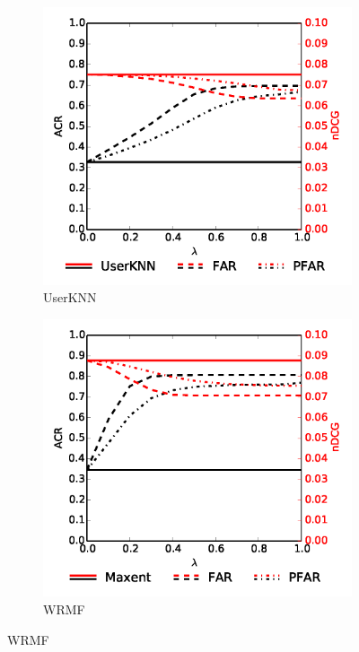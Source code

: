 \begin{figure}
\begin{subfigure}{0.49\columnwidth}
		\includegraphics[width=\textwidth]{imgs/far/userknn.png}
		\caption{UserKNN \cite{resnick1997recommender}} %
	\end{subfigure}
	\begin{subfigure}{0.49\columnwidth} %
		\includegraphics[width=\textwidth]{imgs/far/wrmf.png}
		\caption{WRMF \cite{hu2008collaborative}} %
	\end{subfigure}

\end{figure}
